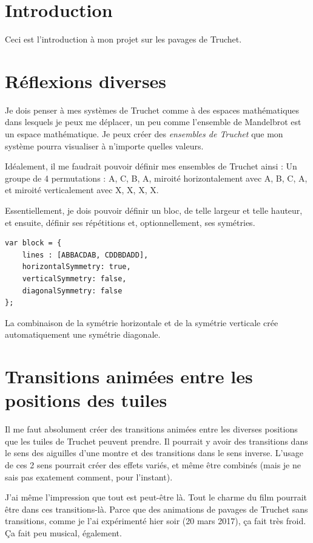 
\section{Introduction}
Ceci est l'introduction à mon projet sur les pavages de Truchet.

\section{Réflexions diverses}

Je dois penser à mes systèmes de Truchet comme à des espaces mathématiques dans lesquels je peux me déplacer, un peu comme l'ensemble de Mandelbrot est un espace mathématique. Je peux créer des \textit{ensembles de Truchet} que mon système pourra visualiser à n'importe quelles valeurs.

Idéalement, il me faudrait pouvoir définir mes ensembles de Truchet ainsi :
Un groupe de 4 permutations : A, C, B, A, miroité horizontalement avec A, B, C, A, et miroité verticalement avec X, X, X, X.

Essentiellement, je dois pouvoir définir un bloc, de telle largeur et telle hauteur, et ensuite, définir ses répétitions et, optionnellement, ses symétries.

\begin{lstlisting}
var block = {
    lines : [ABBACDAB, CDDBDADD],
    horizontalSymmetry: true,
    verticalSymmetry: false,
    diagonalSymmetry: false
};
\end{lstlisting}

La combinaison de la symétrie horizontale et de la symétrie verticale crée automatiquement une symétrie diagonale.

\section{Transitions animées entre les positions des tuiles}
Il me faut absolument créer des transitions animées entre les diverses positions que les tuiles de Truchet peuvent prendre. Il pourrait y avoir des transitions dans le sens des aiguilles d'une montre et des transitions dans le sens inverse. L'usage de ces 2 sens pourrait créer des effets variés, et même être combinés (mais je ne sais pas exatement comment, pour l'instant).

J'ai même l'impression que tout est peut-être là. Tout le charme du film pourrait être dans ces transitions-là. Parce que des animations de pavages de Truchet sans transitions, comme je l'ai expérimenté hier soir (20 mars 2017), ça fait très froid. Ça fait peu musical, également.

